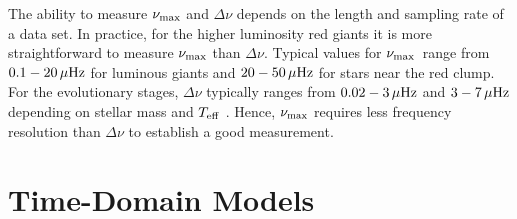 \documentclass[modern]{aastex61}
\newcommand{\numax}{\mbox{$\nu_{\rm max}$}\xspace}
\newcommand{\Dnu}{\mbox{$\Delta \nu$}\xspace}
\newcommand{\teff}{\mbox{$T_{\rm eff}$}\xspace}
\newcommand{\guy}[1]{{\bf \color{blue} #1}}
\begin{document}
The ability to measure \numax and \Dnu depends on the length and sampling rate of a data set.
In practice, for the higher luminosity red giants it is more straightforward to measure \numax than \Dnu.  Typical values for \numax\ range from $0.1-20 \rm\,\mu Hz$ for luminous giants and $20-50 \rm\,\mu Hz$ for stars near the red clump.  For the evolutionary stages, \Dnu typically ranges from $0.02-3 \rm\,\mu Hz$ and $3-7 \rm\,\mu Hz$ depending on stellar mass and \teff
\citep[e.g.,][]{2011A&A...525L...9M, 2013A&A...559A.137M}.  Hence, \numax requires less frequency resolution than \Dnu to establish a good measurement.


\section{Time-Domain Models}
\end{document}
